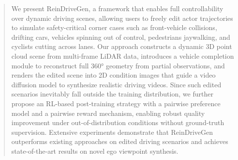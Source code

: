 \documentclass[runningheads]{llncs}
\begin{document}
\begin{abstract}

We present ReinDriveGen, a framework that enables full controllability over dynamic driving scenes, allowing users to freely edit actor trajectories to simulate safety-critical corner cases such as front-vehicle collisions, drifting cars, vehicles spinning out of control, pedestrians jaywalking, and cyclists cutting across lanes. Our approach constructs a dynamic 3D point cloud scene from multi-frame LiDAR data, introduces a vehicle completion module to reconstruct full 360° geometry from partial observations, and renders the edited scene into 2D condition images that guide a video diffusion model to synthesize realistic driving videos. Since such edited scenarios inevitably fall outside the training distribution, we further propose an RL-based post-training strategy with a pairwise preference model and a pairwise reward mechanism, enabling robust quality improvement under out-of-distribution conditions without ground-truth supervision. Extensive experiments demonstrate that ReinDriveGen outperforms existing approaches on edited driving scenarios and achieves state-of-the-art results on novel ego viewpoint synthesis.


\end{abstract}
\end{document}
